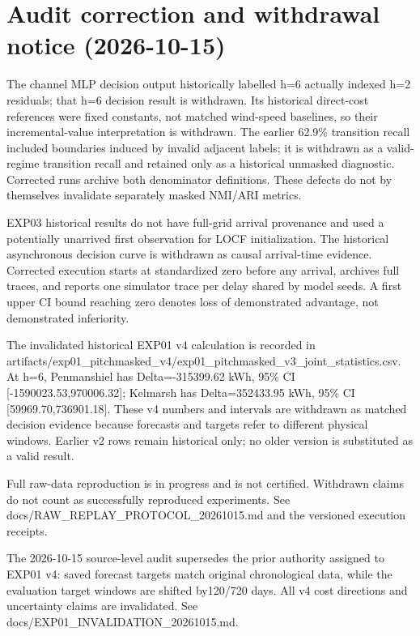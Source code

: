 \documentclass[
  journal]{IEEEtran}
\begin{document}
\section{Audit correction and withdrawal notice
(2026-10-15)}\label{audit-correction-and-withdrawal-notice-2026-10-15}

The channel MLP decision output historically labelled h=6 actually
indexed h=2 residuals; that h=6 decision result is withdrawn. Its
historical direct-cost references were fixed constants, not matched
wind-speed baselines, so their incremental-value interpretation is
withdrawn. The earlier 62.9\% transition recall included boundaries
induced by invalid adjacent labels; it is withdrawn as a valid-regime
transition recall and retained only as a historical unmasked diagnostic.
Corrected runs archive both denominator definitions. These defects do
not by themselves invalidate separately masked NMI/ARI metrics.

EXP03 historical results do not have full-grid arrival provenance and
used a potentially unarrived first observation for LOCF initialization.
The historical asynchronous decision curve is withdrawn as causal
arrival-time evidence. Corrected execution starts at standardized zero
before any arrival, archives full traces, and reports one simulator
trace per delay shared by model seeds. A first upper CI bound reaching
zero denotes loss of demonstrated advantage, not demonstrated
inferiority.

The invalidated historical EXP01 v4 calculation is recorded in
artifacts/exp01\_pitchmasked\_v4/exp01\_pitchmasked\_v3\_joint\_statistics.csv.
At h=6, Penmanshiel has Delta=-315399.62 kWh, 95\% CI
{[}-1590023.53,970006.32{]}; Kelmarsh has Delta=352433.95 kWh, 95\% CI
{[}59969.70,736901.18{]}. These v4 numbers and intervals are withdrawn
as matched decision evidence because forecasts and targets refer to
different physical windows. Earlier v2 rows remain historical only; no
older version is substituted as a valid result.

Full raw-data reproduction is in progress and is not certified.
Withdrawn claims do not count as successfully reproduced experiments.
See docs/RAW\_REPLAY\_PROTOCOL\_20261015.md and the versioned execution
receipts.

The 2026-10-15 source-level audit supersedes the prior authority
assigned to EXP01 v4: saved forecast targets match original
chronological data, while the evaluation target windows are shifted
by120/720 days. All v4 cost directions and uncertainty claims are
invalidated. See docs/EXP01\_INVALIDATION\_20261015.md.
\end{document}
